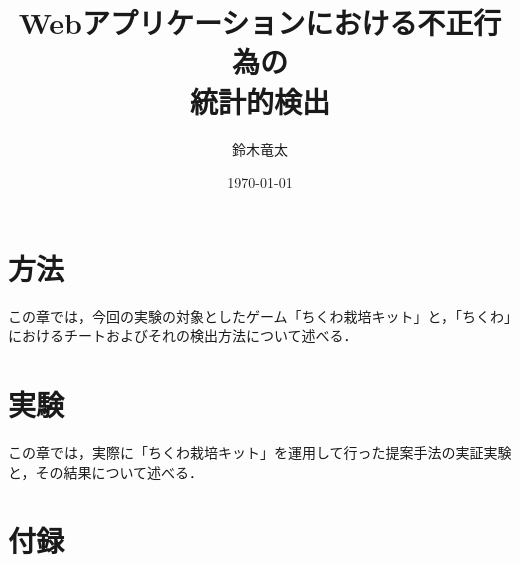 \documentclass[a4paper,12pt]{jsarticle}
\title{Webアプリケーションにおける不正行為の\\統計的検出}
\author{鈴木竜太}
\date{\today}
\begin{document}
\maketitle %

\newpage
\tableofcontents %

\newpage

\newpage
\part{方法}
この章では，今回の実験の対象としたゲーム「ちくわ栽培キット」と，「ちくわ」におけるチートおよびそれの検出方法について述べる．


\newpage
\part{実験}
この章では，実際に「ちくわ栽培キット」を運用して行った提案手法の実証実験と，その結果について述べる．



\newpage

\newpage


\newpage
\part*{付録}
\end{document}
